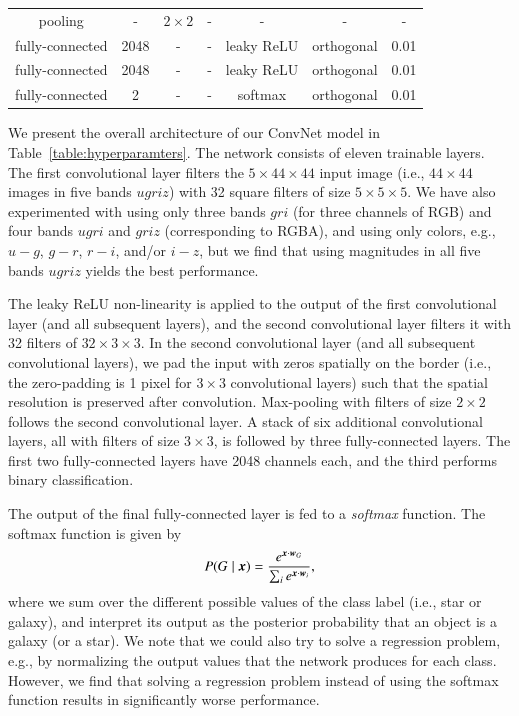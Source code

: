 \documentclass[fleqn,usenatbib]{mnras}
\newcommand{\eg}{{e.g., }}
\newcommand{\ie}{{i.e., }}
\begin{document}
\begin{table}
\begin{tabular}{ccccccc}
    pooling         & -           & $2\times2$  & -       & -             & -               & -              \\
    fully-connected & 2048        & -           & -       & leaky ReLU    & orthogonal      & 0.01            \\
    fully-connected & 2048        & -           & -       & leaky ReLU    & orthogonal      & 0.01            \\
    fully-connected & 2           & -           & -       & softmax       & orthogonal      & 0.01            \\
    \hline
  \end{tabular}
\end{table}

We present the overall architecture of our ConvNet model in Table~\ref{table:hyperparamters}.
The network consists of eleven trainable layers.
The first convolutional layer filters the $5\times44\times44$ input image
(\ie $44\times44$ images in five bands $ugriz$) with 32 square filters of size $5\times5\times5$.
We have also experimented with using only three bands $gri$ (for three channels of RGB) and 
four bands $ugri$ and $griz$ (corresponding to RGBA),
and using only colors, \eg $u-g$, $g-r$, $r-i$, and/or $i-z$,
but we find that using magnitudes in all five bands $ugriz$ yields the best performance.

The leaky ReLU non-linearity is applied to the output of the first convolutional layer
(and all subsequent layers), and the second convolutional layer filters it
with 32 filters of $32\times3\times3$.
In the second convolutional layer (and all subsequent convolutional layers),
we pad the input with zeros spatially on the border
(\ie the zero-padding is 1 pixel for $3\times3$ convolutional layers)
such that the spatial resolution is preserved after convolution.
Max-pooling with filters of size $2\times2$ follows the second convolutional layer.
A stack of six additional convolutional layers, all with filters of size $3\times3$,
is followed by three fully-connected layers.
The first two fully-connected layers have 2048 channels each,
and the third performs binary classification.

The output of the final fully-connected layer is fed to a \textit{softmax} function.
The softmax function is given by
\begin{equation}
  P (G \mid \bmath{x}) = 
    \frac{ e^{ \bmath{x} \cdot \bmath{w}_G } }
    { \sum_{i} e^{ \bmath{x} \cdot \bmath{w}_i } },
\end{equation}
where we sum over the different possible values of the class label (\ie star or galaxy),
and interpret its output as the posterior probability that an object is a galaxy
(or a star).
We note that we could also try to solve a regression problem, \eg
by normalizing the output values that the network produces for each class.
However, we find that solving a regression problem instead of using
the softmax function results in significantly worse performance.
\end{document}
